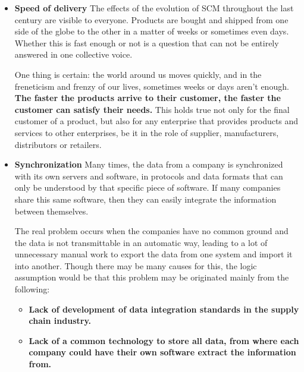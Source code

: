 \begin{itemize}
\item \textbf{Speed of delivery}
The effects of the evolution of SCM throughout the last century are visible to everyone. Products are bought and shipped from one side of the globe to the other in a matter of weeks or sometimes even days. Whether this is fast enough or not is a question that can not be entirely answered in one collective voice. 

One thing is certain: the world around us moves quickly, and in the freneticism and frenzy of our lives, sometimes weeks or days aren't enough.  \textbf{The faster the products arrive to their customer, the faster the customer can satisfy their needs.}  This holds true not only for the final customer of a product, but also for any enterprise that provides products and services to other enterprises, be it in the role of supplier, manufacturers, distributors or retailers. 

\item \textbf{Synchronization}
Many times, the data from a company is synchronized with its own servers and software, in protocols and data formats that can only be understood by that specific piece of software. If many companies share this same software, then they can easily integrate the information between themselves.

The real problem occurs when the companies have no common ground and the data is not transmittable in an automatic way, leading to a lot of unnecessary manual work to export the data from one system and import it into another. Though there may be many causes for this, the logic assumption would be that this problem may be originated mainly from the following:

\begin{itemize}
\item \textbf{Lack of development of data integration standards in the supply chain industry.}
\item \textbf{Lack of a common technology to store all data, from where each company could have their own software extract the information from.}
\end{itemize}


\end{itemize}
